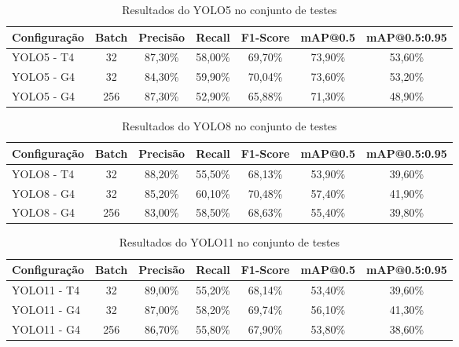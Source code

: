 \begin{table}[H]
    \caption{Resultados do YOLO5 no conjunto de testes}
    \label{tab:resultados-YOLO5}
    \centering
    \small
    \begin{tabular}{lcccccc}
        \toprule
        \textbf{Configuração} & \textbf{Batch} & \textbf{Precisão} & \textbf{Recall} & \textbf{F1-Score} & \textbf{mAP@0.5} & \textbf{mAP@0.5:0.95} \\
        \midrule
        YOLO5 - T4 & 32  & 87,30\%  & 58,00\%  & 69,70\% & 73,90\% & 53,60\% \\
        YOLO5 - G4 & 32  & 84,30\%  & 59,90\%  & 70,04\% & 73,60\% & 53,20\% \\
        YOLO5 - G4 & 256 & 87,30\%  & 52,90\%  & 65,88\% & 71,30\% & 48,90\% \\
        \bottomrule
    \end{tabular}
\end{table}
\vspace{-1em}

\begin{table}[H]
    \caption{Resultados do YOLO8 no conjunto de testes}
    \label{tab:resultados-YOLO8}
    \centering
    \small
    \begin{tabular}{lcccccc}
        \toprule
        \textbf{Configuração} & \textbf{Batch} & \textbf{Precisão} & \textbf{Recall} & \textbf{F1-Score} & \textbf{mAP@0.5} & \textbf{mAP@0.5:0.95} \\
        \midrule
        YOLO8 - T4 & 32  & 88,20\%  & 55,50\%  & 68,13\% & 53,90\% & 39,60\% \\
        YOLO8 - G4 & 32  & 85,20\%  & 60,10\%  & 70,48\% & 57,40\% & 41,90\% \\
        YOLO8 - G4 & 256 & 83,00\%  & 58,50\%  & 68,63\% & 55,40\% & 39,80\% \\
        \bottomrule
    \end{tabular}
\end{table}
\vspace{-1em}

\begin{table}[H]
    \caption{Resultados do YOLO11 no conjunto de testes}
    \label{tab:resultados-YOLO11}
    \centering
    \small
    \begin{tabular}{lcccccc}
        \toprule
        \textbf{Configuração} & \textbf{Batch} & \textbf{Precisão} & \textbf{Recall} & \textbf{F1-Score} & \textbf{mAP@0.5} & \textbf{mAP@0.5:0.95} \\
        \midrule
        YOLO11 - T4 & 32  & 89,00\%  & 55,20\%  & 68,14\% & 53,40\% & 39,60\% \\
        YOLO11 - G4 & 32  & 87,00\%  & 58,20\%  & 69,74\% & 56,10\% & 41,30\% \\
        YOLO11 - G4 & 256 & 86,70\%  & 55,80\%  & 67,90\% & 53,80\% & 38,60\% \\
        \bottomrule
    \end{tabular}
\end{table}
\vspace{-1em}

